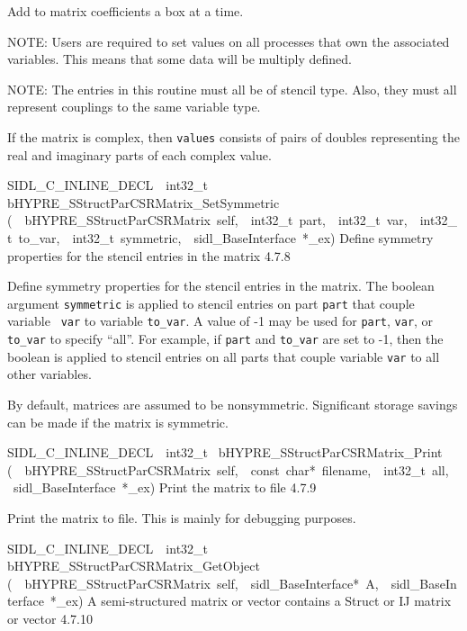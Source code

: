 \documentclass{article}
\begin{document}
\begin{cxxentry}
\begin{cxxentry}
\begin{cxxfunction}
\begin{cxxdoc}
Add to matrix coefficients a box at a time.

NOTE: Users are required to set values on all processes that
own the associated variables.  This means that some data will
be multiply defined.

NOTE: The entries in this routine must all be of stencil
type.  Also, they must all represent couplings to the same
variable type.

If the matrix is complex, then {\tt values} consists of pairs
of doubles representing the real and imaginary parts of each
complex value.
\end{cxxdoc}
\end{cxxfunction}
\begin{cxxfunction}
{SIDL\_C\_INLINE\_DECL\ \ int32\_t\ }
        {bHYPRE\_SStructParCSRMatrix\_SetSymmetric}
        {(\ \ bHYPRE\_SStructParCSRMatrix\ self,\ \ int32\_t\ part,\ \ int32\_t\ var,\ \ int32\_t\ to\_var,\ \ int32\_t\ symmetric,\ \ sidl\_BaseInterface\ *\_ex)}
        {
Define symmetry properties for the stencil entries in the
matrix}
        {4.7.8}
\begin{cxxdoc}

Define symmetry properties for the stencil entries in the
matrix.  The boolean argument {\tt symmetric} is applied to
stencil entries on part {\tt part} that couple variable {\tt
var} to variable {\tt to\_var}.  A value of -1 may be used
for {\tt part}, {\tt var}, or {\tt to\_var} to specify
``all''.  For example, if {\tt part} and {\tt to\_var} are
set to -1, then the boolean is applied to stencil entries on
all parts that couple variable {\tt var} to all other
variables.

By default, matrices are assumed to be nonsymmetric.
Significant storage savings can be made if the matrix is
symmetric.
\end{cxxdoc}
\end{cxxfunction}
\begin{cxxfunction}
{SIDL\_C\_INLINE\_DECL\ \ int32\_t\ }
        {bHYPRE\_SStructParCSRMatrix\_Print}
        {(\ \ bHYPRE\_SStructParCSRMatrix\ self,\ \ const\ char*\ filename,\ \ int32\_t\ all,\ \ sidl\_BaseInterface\ *\_ex)}
        {
Print the matrix to file}
        {4.7.9}
\begin{cxxdoc}

Print the matrix to file.  This is mainly for debugging
purposes.
\end{cxxdoc}
\end{cxxfunction}
\begin{cxxfunction}
{SIDL\_C\_INLINE\_DECL\ \ int32\_t\ }
        {bHYPRE\_SStructParCSRMatrix\_GetObject}
        {(\ \ bHYPRE\_SStructParCSRMatrix\ self,\ \ sidl\_BaseInterface*\ A,\ \ sidl\_BaseInterface\ *\_ex)}
        {
A semi-structured matrix or vector contains a Struct or IJ matrix
or vector}
        {4.7.10}
\begin{cxxdoc}


\end{cxxdoc}
\end{cxxfunction}
\end{cxxentry}
\end{cxxentry}
\end{document}
